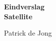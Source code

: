 \begin{titlepage}
    \begin{center}
        \vspace*{1cm}
  
        \huge{\textbf{Eindverslag}} \\ \vspace{0.2cm} \large 
        \large{\textbf{Satellite}} \\
        \vspace{0.2cm}
        \large
  
        Patrick de Jong \\
        \vfill
  
        \vspace{0.8cm}
    
    \end{center}
 \end{titlepage}